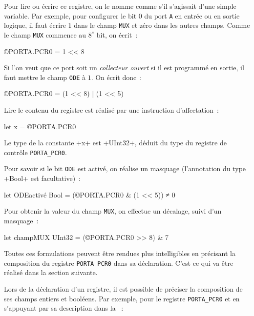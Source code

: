 Pour lire ou écrire ce registre, on le nomme comme s'il s'agissait d'une simple variable. Par exemple, pour configurer le bit $0$ du port \texttt{A} en entrée ou en sortie logique, il faut écrire $1$ dans le champ \texttt{MUX} et zéro dans les autres champs. Comme le champ \texttt{MUX} commence au $8^e$ bit, on écrit~:

\begin{OMNIBUS}
©PORTA.PCR0 = 1 << 8
\end{OMNIBUS}

Si l'on veut que ce port soit un \emph{collecteur ouvert} si il est programmé en sortie, il faut mettre le champ \texttt{ODE} à $1$. On écrit donc~:
\begin{OMNIBUS}
©PORTA.PCR0 = (1 << 8) | (1 << 5)
\end{OMNIBUS}

Lire le contenu du registre est réalisé par une instruction d'affectation~:
\begin{OMNIBUS}
let x = ©PORTA.PCR0
\end{OMNIBUS}
Le type de la constante \omnibus+x+ est \omnibus+UInt32+, déduit du type du registre de contrôle \texttt{PORTA\_PCR0}.

Pour savoir si le bit \texttt{ODE} est activé, on réalise un masquage (l'annotation du type \omnibus+Bool+ est facultative)~:
\begin{OMNIBUS}
let ODEactivé Bool = (©PORTA.PCR0 & (1 << 5)) ≠ 0
\end{OMNIBUS}

Pour obtenir la valeur du champ \texttt{MUX}, on effectue un décalage, suivi d'un masquage~:
\begin{OMNIBUS}
let champMUX UInt32 = (©PORTA.PCR0 >> 8) & 7
\end{OMNIBUS}


Toutes ces formulations peuvent être rendues plus intelligibles en précisant la composition du registre \texttt{PORTA\_PCR0} dans sa déclaration. C'est ce qui va être réalisé dans la section suivante.









Lors de la déclaration d'un registre, il est possible de préciser la composition de ses champs entiers et booléens. Par exemple, pour le registre \texttt{PORTA\_PCR0} et en s'appuyant par sa description dans la ~:

